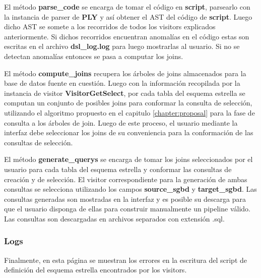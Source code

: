 El método \textbf{parse\_code} se encarga de tomar el código en \textbf{script}, parsearlo 
con la instancia de parser de \textbf{PLY} y as\'i obtener el AST del código de \textbf{script}. 
Luego dicho AST se somete a los recorridos de todos los visitors explicados anteriormente. Si dichos 
recorridos encuentran anomalías en el código estas son escritas en el archivo \textbf{dsl\_log.log} 
para luego mostrarlas al usuario. Si no se detectan anomalías entonces se pasa a computar los joins. 

El método \textbf{compute\_joins} recupera los \'arboles de joins almacenados para la base de datos 
fuente en cuestión. Luego con la información recopilada por la instancia de visitor \textbf{VisitorGetSelect}, 
por cada tabla del esquema estrella se computan un conjunto de posibles joins para conformar la consulta 
de selección, utilizando el algoritmo propuesto en el capitulo \ref{chapter:proposal} para la fase 
de consulta a los \'arboles de join. Luego de este proceso, el usuario mediante la interfaz debe seleccionar 
los joins de su conveniencia para la conformación de las consultas de selección. 

El método \textbf{generate\_querys} se encarga de tomar los joins seleccionados por el usuario para 
cada tabla del esquema estrella y conformar las consultas de creación y de selección. El visitor 
correspondiente para la generación de ambas consultas se selecciona utilizando los campos 
\textbf{source\_sgbd} y \textbf{target\_sgbd}. Las consultas generadas son mostradas en la interfaz y es 
posible su descarga para que el usuario disponga de ellas para construir manualmente un pipeline válido. 
Las consultas son descargadas en archivos separados con extensión .sql.

\subsubsection{Logs}

Finalmente, en esta página se muestran los errores en la escritura del script de definición del esquema
estrella encontrados por los visitors.